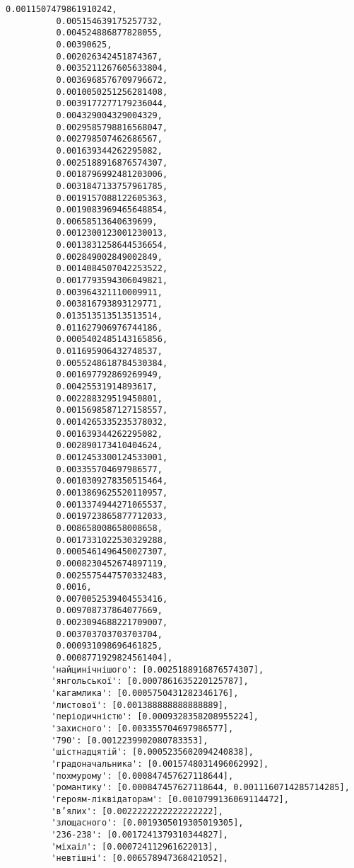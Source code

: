 \documentclass[11pt]{article}
\begin{document}
\begin{Verbatim}[commandchars=\\\{\}]
          0.0011507479861910242,
          0.005154639175257732,
          0.004524886877828055,
          0.00390625,
          0.002026342451874367,
          0.0035211267605633804,
          0.0036968576709796672,
          0.0010050251256281408,
          0.0039177277179236044,
          0.004329004329004329,
          0.0029585798816568047,
          0.002798507462686567,
          0.001639344262295082,
          0.0025188916876574307,
          0.0018796992481203006,
          0.0031847133757961785,
          0.0019157088122605363,
          0.0019083969465648854,
          0.00658513640639699,
          0.0012300123001230013,
          0.0013831258644536654,
          0.002849002849002849,
          0.0014084507042253522,
          0.0017793594306049821,
          0.003964321110009911,
          0.003816793893129771,
          0.013513513513513514,
          0.011627906976744186,
          0.0005402485143165856,
          0.011695906432748537,
          0.0055248618784530384,
          0.001697792869269949,
          0.00425531914893617,
          0.002288329519450801,
          0.0015698587127158557,
          0.0014265335235378032,
          0.001639344262295082,
          0.002890173410404624,
          0.0012453300124533001,
          0.003355704697986577,
          0.0010309278350515464,
          0.0013869625520110957,
          0.0013374944271065537,
          0.0019723865877712033,
          0.008658008658008658,
          0.0017331022530329288,
          0.0005461496450027307,
          0.0008230452674897119,
          0.0025575447570332483,
          0.0016,
          0.0070052539404553416,
          0.009708737864077669,
          0.0023094688221709007,
          0.003703703703703704,
          0.000931098696461825,
          0.0008771929824561404],
         'найцинічнішого': [0.0025188916876574307],
         'янгольської': [0.0007861635220125787],
         'кагамлика': [0.0005750431282346176],
         'листової': [0.001388888888888889],
         'періодичністю': [0.0009328358208955224],
         'захисного': [0.003355704697986577],
         '790': [0.0012239902080783353],
         'шістнадцятій': [0.0005235602094240838],
         'градоначальника': [0.0015748031496062992],
         'похмурому': [0.000847457627118644],
         'романтику': [0.000847457627118644, 0.0011160714285714285],
         'героям-ліквідаторам': [0.0010799136069114472],
         'в’ялих': [0.0022222222222222222],
         'злощасного': [0.0019305019305019305],
         '236-238': [0.0017241379310344827],
         'міхаіл': [0.000724112961622013],
         'невтішні': [0.006578947368421052],

\end{Verbatim}
\end{document}
